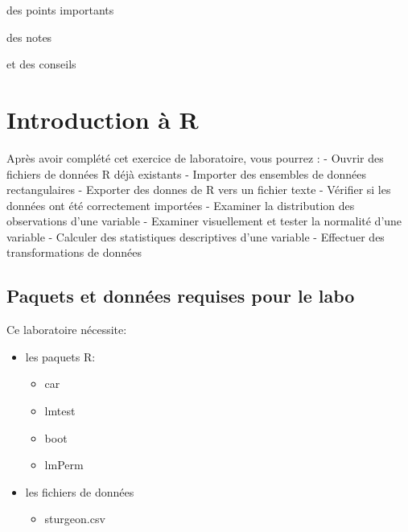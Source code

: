 \documentclass[12pt,]{book}
\makeatletter
\providecommand{\tightlist}{%
  \setlength{\itemsep}{0pt}\setlength{\parskip}{0pt}}
\newenvironment{kframe}{%
\medskip{}
\setlength{\fboxsep}{.8em}
 \def\at@end@of@kframe{}%
 \ifinner\ifhmode%
  \def\at@end@of@kframe{\end{minipage}}%
  \begin{minipage}{\columnwidth}%
 \fi\fi%
 \def\FrameCommand##1{\hskip\@totalleftmargin \hskip-\fboxsep
 \colorbox{shadecolor}{##1}\hskip-\fboxsep
     \hskip-\linewidth \hskip-\@totalleftmargin \hskip\columnwidth}%
 \MakeFramed {\advance\hsize-\width
   \@totalleftmargin\z@ \linewidth\hsize
   \@setminipage}}%
 {\par\unskip\endMakeFramed%
 \at@end@of@kframe}
\newenvironment{rmdblock}[1]
  {
  \begin{itemize}
  \renewcommand{\labelitemi}{
    \raisebox{-.7\height}[0pt][0pt]{
      {\setkeys{Gin}{width=3em,keepaspectratio}\texttt{[image: images/\#1]}}
    }
  }
  \setlength{\fboxsep}{1em}
  \begin{kframe}
  \item
  }
  {
  \end{kframe}
  \end{itemize}
  }
\newenvironment{rmdnote}
  {\begin{rmdblock}{note}}
  {\end{rmdblock}}
\newenvironment{rmdimportant}
  {\begin{rmdblock}{important}}
  {\end{rmdblock}}
\newenvironment{rmdtip}
  {\begin{rmdblock}{tip}}
  {\end{rmdblock}}
\makeatother
\begin{document}
\begin{rmdimportant}
des points importants
\end{rmdimportant}

\begin{rmdnote}
des notes
\end{rmdnote}

\begin{rmdtip}
et des conseils
\end{rmdtip}

\hypertarget{introductionR}{%
\chapter{Introduction à R}\label{introductionR}}

Après avoir complété cet exercice de laboratoire, vous pourrez :
- Ouvrir des fichiers de données R déjà existants
- Importer des ensembles de données rectangulaires
- Exporter des donnes de R vers un fichier texte
- Vérifier si les données ont été correctement importées
- Examiner la distribution des observations d'une variable
- Examiner visuellement et tester la normalité d'une variable
- Calculer des statistiques descriptives d'une variable
- Effectuer des transformations de données

\hypertarget{set-intro}{%
\section{Paquets et données requises pour le labo}\label{set-intro}}

Ce laboratoire nécessite:

\begin{itemize}
\tightlist
\item
  les paquets R:

  \begin{itemize}
  \tightlist
  \item
    car
  \item
    lmtest
  \item
    boot
  \item
    lmPerm
  \end{itemize}
\item
  les fichiers de données

  \begin{itemize}
  \tightlist
  \item
    sturgeon.csv
  \end{itemize}
\end{itemize}
\end{document}
